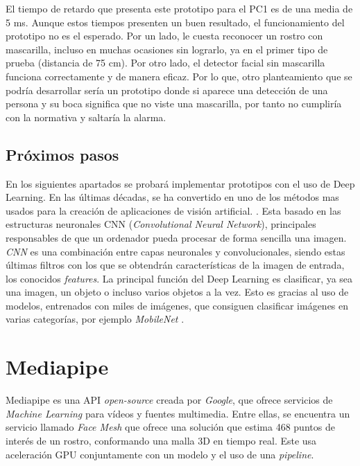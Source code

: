 El tiempo de retardo que presenta este prototipo para el PC1 es de una media de 5 ms. Aunque estos tiempos presenten un buen resultado, el funcionamiento del prototipo no es el esperado. Por un lado, le cuesta reconocer un rostro con mascarilla, incluso en muchas ocasiones sin lograrlo, ya en el primer tipo de prueba (distancia de 75 cm). Por otro lado, el detector facial sin mascarilla funciona correctamente y de manera eficaz. Por lo que, otro planteamiento que se podría desarrollar sería un prototipo donde si aparece una detección de una persona y su boca significa que no viste una mascarilla, por tanto no cumpliría con la normativa y saltaría la alarma.

\vspace{-0.8cm}
\subsection*{Próximos pasos}
\vspace{-0.5cm}
En los siguientes apartados se probará implementar prototipos con el uso de Deep Learning. En las últimas décadas, se ha convertido en uno de los métodos mas usados para la creación de aplicaciones de visión artificial. \cite{szeliski_2018}. Esta basado en las estructuras neuronales CNN (\textit{Convolutional Neural Network}), principales responsables de que un ordenador pueda procesar de forma sencilla una imagen. \textit{CNN} es una combinación entre capas neuronales y convolucionales, siendo estas últimas filtros con los que se obtendrán características de la imagen de entrada, los conocidos \textit{features}. La principal función del Deep Learning es clasificar, ya sea una imagen, un objeto o incluso varios objetos a la vez. Esto es gracias al uso de modelos, entrenados con miles de imágenes, que consiguen clasificar imágenes en varias categorías, por ejemplo \textit{MobileNet} \cite{cnn}. 

\newpage
\section{Mediapipe}

Mediapipe es una API \textit{open-source} creada por \textit{Google}, que ofrece servicios de \textit{Machine Learning} para vídeos y fuentes multimedia. Entre ellas, se encuentra un servicio llamado \textit{Face Mesh} que ofrece una solución que estima 468 puntos de interés de un rostro, conformando una malla 3D en tiempo real. Este usa aceleración GPU conjuntamente con un modelo y el uso de una \textit{pipeline}.

